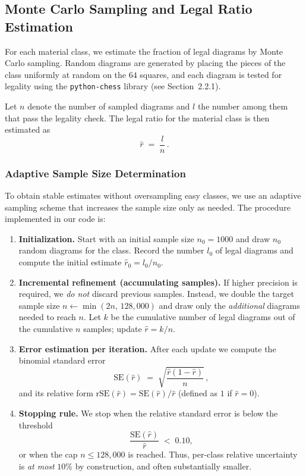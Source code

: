 \documentclass[12pt]{article}
\begin{document}
\subsection{Monte Carlo Sampling and Legal Ratio Estimation}

For each material class, we estimate the fraction of legal diagrams by Monte Carlo sampling. Random diagrams are generated by placing the pieces of the class uniformly at random on the $64$ squares, and each diagram is tested for legality using the \texttt{python-chess} library (see Section~2.2.1).

Let $n$ denote the number of sampled diagrams and $l$ the number among them that pass the legality check. The legal ratio for the material class is then estimated as
\begin{equation}
\hat{r} \;=\; \frac{l}{n}\, .
\end{equation}

\subsubsection{Adaptive Sample Size Determination}

To obtain stable estimates without oversampling easy classes, we use an adaptive sampling scheme that increases the sample size only as needed. The procedure implemented in our code is:

\begin{enumerate}
  \item \textbf{Initialization.} Start with an initial sample size $n_0 = 1000$ and draw $n_0$ random diagrams for the class. Record the number $l_0$ of legal diagrams and compute the initial estimate $\hat{r}_0 = l_0/n_0$.
  \item \textbf{Incremental refinement (accumulating samples).} If higher precision is required, we \emph{do not} discard previous samples. Instead, we double the target sample size $n \leftarrow \min(2n,\,128{,}000)$ and draw only the \emph{additional} diagrams needed to reach $n$. Let $k$ be the cumulative number of legal diagrams out of the cumulative $n$ samples; update $\hat{r}=k/n$.
  \item \textbf{Error estimation per iteration.} After each update we compute the binomial standard error
  \begin{equation}
     \mathrm{SE}(\hat{r}) \;=\; \sqrt{\frac{\hat{r}(1-\hat{r})}{n}}\, ,
  \end{equation}
  and its relative form $\mathrm{rSE}(\hat{r}) = \mathrm{SE}(\hat{r})/\hat{r}$ (defined as $1$ if $\hat{r}=0$).
  \item \textbf{Stopping rule.} We stop when the relative standard error is below the threshold
  \begin{equation}
     \frac{\mathrm{SE}(\hat{r})}{\hat{r}} \;<\; 0.10,
  \end{equation}
  or when the cap $n \le 128{,}000$ is reached. Thus, per-class relative uncertainty is \emph{at most} $10\%$ by construction, and often substantially smaller.
\end{enumerate}
\end{document}
